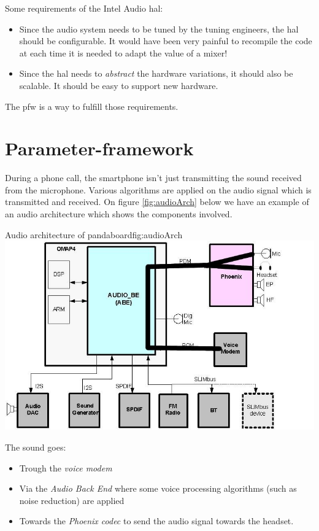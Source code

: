 Some requirements of the Intel Audio \gls{hal}:
\begin{itemize}
    \item Since the audio system needs to be tuned by the tuning engineers, the \gls{hal} should be configurable.
        It would have been very painful to recompile the code at each time it is needed to adapt the value of a mixer!
    \item Since the \gls{hal} needs to \emph{abstract} the hardware variations, it should also be scalable. It should be
        easy to support new hardware.
\end{itemize}

The \gls{pfw} is a way to fulfill those requirements.

\section{Parameter-framework}
\label{sec:parameter-framework}
During a phone call, the smartphone isn't just transmitting the sound received from the microphone. Various algorithms are
applied on the audio signal which is transmitted and received.
On figure \ref{fig:audioArch} below we have an example of an audio architecture which shows the components involved.

\begin{figureGraphics}{Audio architecture of pandaboard}{fig:audioArch}
    \includegraphics[height=0.5\textheight]{./src/img/Audio_arch2.jpg}
\end{figureGraphics}

The sound goes:
\begin{itemize}
    \item Trough the \emph{voice modem}
    \item Via the \emph{Audio Back End} where some voice processing algorithms (such as noise reduction) are applied
    \item Towards the \emph{Phoenix codec} to send the audio signal towards the headset.
\end{itemize}

